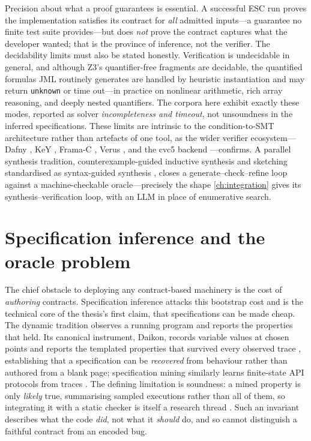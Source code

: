 Precision about what a proof guarantees is essential. A successful ESC run proves
the implementation satisfies its contract for \emph{all} admitted inputs---a
guarantee no finite test suite provides---but does \emph{not} prove the contract
captures what the developer wanted; that is the province of inference, not the
verifier. The decidability limits must also be stated honestly. Verification is
undecidable in general, and although Z3's quantifier-free fragments are decidable,
the quantified formulas JML routinely generates are handled by heuristic
instantiation and may return \texttt{unknown} or time out---in practice on
nonlinear arithmetic, rich array reasoning, and deeply nested quantifiers. The
corpora here exhibit exactly these modes, reported as solver \emph{incompleteness
and timeout}, not unsoundness in the inferred specifications. These limits are
intrinsic to the condition-to-SMT architecture rather than artefacts of one tool,
as the wider verifier ecosystem---Dafny \cite{leino2010dafny}, KeY
\cite{ahrendt2016key}, Frama-C \cite{kirchner2015framac}, Verus
\cite{lattuada2023verus}, and the cvc5 backend \cite{barbosa2022cvc5}---confirms. A
parallel synthesis tradition, counterexample-guided inductive synthesis and
sketching \cite{solarlezama2006sketching,solarlezama2008sketching} standardised as
syntax-guided synthesis \cite{alur2013sygus}, closes a generate--check--refine loop
against a machine-checkable oracle---precisely the shape \cref{ch:integration} gives
its synthesis--verification loop, with an LLM in place of enumerative search.

\section{Specification inference and the oracle problem}\label{sec:bg-inference}

The chief obstacle to deploying any contract-based machinery is the cost of
\emph{authoring} contracts. Specification inference attacks this bootstrap cost and
is the technical core of the thesis's first claim, that specifications can be made
cheap. The dynamic tradition observes a running program and reports the properties
that held. Its canonical instrument, Daikon, records variable values at chosen
points and reports the templated properties that survived every observed trace
\cite{ernst2007daikon}, establishing that a specification can be \emph{recovered}
from behaviour rather than authored from a blank page; specification mining
similarly learns finite-state API protocols from traces \cite{ammons2002mining}.
The defining limitation is soundness: a mined property is only \emph{likely} true,
summarising sampled executions rather than all of them, so integrating it with a
static checker is itself a research thread \cite{nimmer2001static}. Such an
invariant describes what the code \emph{did}, not what it \emph{should} do, and so
cannot distinguish a faithful contract from an encoded bug.


